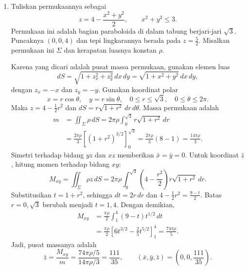 \documentclass[11pt,a4paper]{article}
\begin{document}
\begin{enumerate}[itemsep=12pt,parsep=5pt]
  \item Tuliskan permukaannya sebagai
        \[
          z=4-\frac{x^2+y^2}{2},\qquad x^2+y^2\le3.
        \]
        Permukaan ini adalah bagian paraboloida di dalam tabung berjari-jari $\sqrt3$.
        Puncaknya $(0,0,4)$ dan tepi lingkarannya berada pada $z=\frac52$.
        Misalkan permukaan ini $\Sigma$ dan kerapatan luasnya konstan $\rho$.

        Karena yang dicari adalah pusat massa permukaan, gunakan elemen luas
        \[
          dS=\sqrt{1+z_x^2+z_y^2}\,dx\,dy
          =\sqrt{1+x^2+y^2}\,dx\,dy,
        \]
        dengan $z_x=-x$ dan $z_y=-y$.
        Gunakan koordinat polar
        \[
          x=r\cos\theta,\quad y=r\sin\theta,\quad
          0\le r\le\sqrt3,\quad0\le\theta\le2\pi.
        \]
        Maka $z=4-\frac12r^2$ dan $dS=r\sqrt{1+r^2}\,dr\,d\theta$.
        Massa permukaan adalah
        \begin{align*}
          m & =\iint_\Sigma\rho\,dS
          =2\pi\rho\int_0^{\sqrt3}r\sqrt{1+r^2}\,dr                    \\
            & =\frac{2\pi\rho}{3}\left[(1+r^2)^{3/2}\right]_0^{\sqrt3}
          =\frac{2\pi\rho}{3}(8-1)=\frac{14\pi\rho}{3}.
        \end{align*}
        Simetri terhadap bidang $yz$ dan $xz$ memberikan $\bar x=\bar y=0$.
        Untuk koordinat $\bar z$, hitung momen terhadap bidang $xy$:
        \[
          M_{xy}=\iint_\Sigma\rho z\,dS
          =2\pi\rho\int_0^{\sqrt3}
          \left(4-\frac{r^2}{2}\right)r\sqrt{1+r^2}\,dr.
        \]
        Substitusikan $t=1+r^2$, sehingga $dt=2r\,dr$ dan
        $4-\frac12r^2=\frac{9-t}{2}$.
        Batas $r=0,\sqrt3$ berubah menjadi $t=1,4$.
        Dengan demikian,
        \begin{align*}
          M_{xy} & =\frac{\pi\rho}{2}\int_1^4(9-t)t^{1/2}\,dt \\
                 & =\frac{\pi\rho}{2}
          \left[6t^{3/2}-\frac25t^{5/2}\right]_1^4
          =\frac{74\pi\rho}{5}.
        \end{align*}
        Jadi, pusat massanya adalah
        \[
          \bar z=\frac{M_{xy}}m
          =\frac{74\pi\rho/5}{14\pi\rho/3}=\frac{111}{35},
          \qquad
          \boxed{(\bar x,\bar y,\bar z)=\left(0,0,\frac{111}{35}\right).}
        \]


\end{enumerate}
\end{document}
